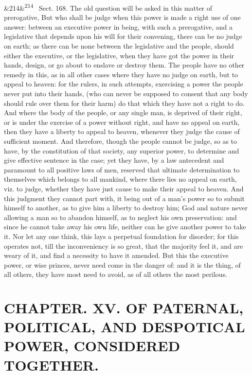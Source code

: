 \documentclass[12pt]{article}
\newcommand{\para}[1][]{\par\noindent\ifx&#1&\else\textsuperscript{\footnotesize #1}~\fi}
\begin{document}
\para[214] Sect. 168. The old question will be asked in this matter of prerogative, But who shall be judge when this power is made a right use of one answer: between an executive power in being, with such a prerogative, and a legislative that depends upon his will for their convening, there can be no judge on earth; as there can be none between the legislative and the people, should either the executive, or the legislative, when they have got the power in their hands, design, or go about to enslave or destroy them. The people have no other remedy in this, as in all other cases where they have no judge on earth, but to appeal to heaven: for the rulers, in such attempts, exercising a power the people never put into their hands, (who can never be supposed to consent that any body should rule over them for their harm) do that which they have not a right to do. And where the body of the people, or any single man, is deprived of their right, or is under the exercise of a power without right, and have no appeal on earth, then they have a liberty to appeal to heaven, whenever they judge the cause of sufficient moment. And therefore, though the people cannot be judge, so as to have, by the constitution of that society, any superior power, to determine and give effective sentence in the case; yet they have, by a law antecedent and paramount to all positive laws of men, reserved that ultimate determination to themselves which belongs to all mankind, where there lies no appeal on earth, viz. to judge, whether they have just cause to make their appeal to heaven. And this judgment they cannot part with, it being out of a man's power so to submit himself to another, as to give him a liberty to destroy him; God and nature never allowing a man so to abandon himself, as to neglect his own preservation: and since he cannot take away his own life, neither can he give another power to take it. Nor let any one think, this lays a perpetual foundation for disorder; for this operates not, till the inconveniency is so great, that the majority feel it, and are weary of it, and find a necessity to have it amended. But this the executive power, or wise princes, never need come in the danger of: and it is the thing, of all others, they have most need to avoid, as of all others the most perilous.

\section*{CHAPTER. XV. OF PATERNAL, POLITICAL, AND DESPOTICAL POWER, CONSIDERED TOGETHER.}
\end{document}
